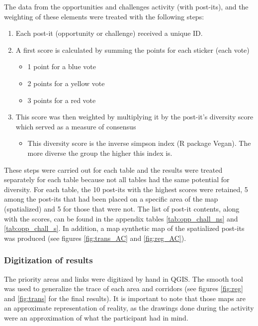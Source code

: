 The data from the opportunities and challenges activity (with post-its), and the weighting of these elements were treated with the following steps:
\begin{enumerate}
  \item Each post-it (opportunity or challenge) received a unique ID.
  \item A first score is calculated by summing the points for each sticker (each vote)
  \begin{itemize}
      \item 1 point for a blue vote
      \item 2 points for a yellow vote
      \item 3 points for a red vote
  \end{itemize}
  \item This score was then weighted by multiplying it by the post-it’s diversity score which served as a measure of consensus
\begin{itemize}
\item This diversity score is the inverse simpson index (R package Vegan). The more diverse the group the higher this index is.
\end{itemize}
\end{enumerate}
These steps were carried out for each table and the results were treated separately for each table because not all tables had the same potential for diversity. For each table, the 10 post-its with the highest scores were retained, 5 among the post-its that had been placed on a specific area of the map (spatialized) and 5 for those that were not. The list of post-it contents, along with the scores, can be found in the appendix tables \ref{tab:opp_chall_ns} and \ref{tab:opp_chall_s}. In addition, a map synthetic map of the spatialized post-its was produced (see figures \ref{fig:trans_AC} and \ref{fig:reg_AC}).\\

\subsubsection*{Digitization of results}

The priority areas and links were digitized by hand in QGIS. The smooth tool was used to generalize the trace of each area and corridors (see figures \ref{fig:reg}  and \ref{fig:trans} for the final results). It is important to note that those maps are an approximate representation of reality, as the drawings done during the activity were an approximation of what the participant had in mind.

